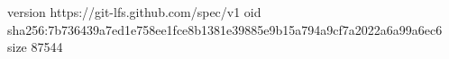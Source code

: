 version https://git-lfs.github.com/spec/v1
oid sha256:7b736439a7ed1e758ee1fce8b1381e39885e9b15a794a9cf7a2022a6a99a6ec6
size 87544
